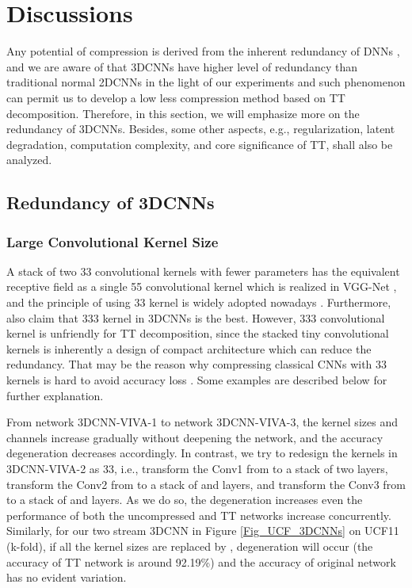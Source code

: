 \documentclass[a4paper,fleqn]{cas-dc}
\begin{document}
\section{Discussions}\label{sec:Dis}

Any potential of compression is derived from the inherent redundancy of DNNs \citep{Denil_2013_Redundancy}, and we are aware of that 3DCNNs have higher level of redundancy than traditional normal 2DCNNs in the light of our experiments and such phenomenon can permit us to develop a low less compression method based on TT decomposition. Therefore, in this section, we will emphasize more on the redundancy of 3DCNNs. Besides, some other aspects, e.g., regularization, latent degradation, computation complexity, and core significance of TT, shall also be analyzed.

\subsection{Redundancy of 3DCNNs}

\subsubsection{Large Convolutional Kernel Size}\quad

A stack of two 33 convolutional kernels with fewer parameters has the equivalent receptive field as a single 55 convolutional kernel which is realized in VGG-Net \citep{Simonyan_2015_VGG}, and the principle of using 33 kernel is widely adopted nowadays \citep{He_2016_ResNet,Huang_2017_DenseNet}. Furthermore, \citet{Tran_2015_3DCNN} also claim that 333 kernel in 3DCNNs is the best. However, 333 convolutional kernel is unfriendly for TT decomposition, since the stacked tiny convolutional kernels is inherently a design of compact architecture which can reduce the redundancy. That may be the reason why compressing classical CNNs with 33 kernels is hard to avoid accuracy loss \citep{Garipov_2016_TTCNN}. Some examples are described below for further explanation.

From network 3DCNN-VIVA-1 to network 3DCNN-VIVA-3, the kernel sizes and channels increase gradually without deepening the network, and the accuracy degeneration decreases accordingly. In contrast, we try to redesign the kernels in 3DCNN-VIVA-2 as 33, i.e., transform the Conv1 from  to a stack of two  layers, transform the Conv2 from  to a stack of  and  layers, and transform the Conv3 from  to a stack of  and  layers. As we do so, the degeneration increases even the performance of both the uncompressed and TT networks increase concurrently. Similarly, for our two stream 3DCNN in Figure \ref{Fig_UCF_3DCNNs} on UCF11 (k-fold), if all the kernel sizes are replaced by , degeneration will occur (the accuracy of TT network is around 92.19\%) and the accuracy of original network has no evident variation.
\end{document}
